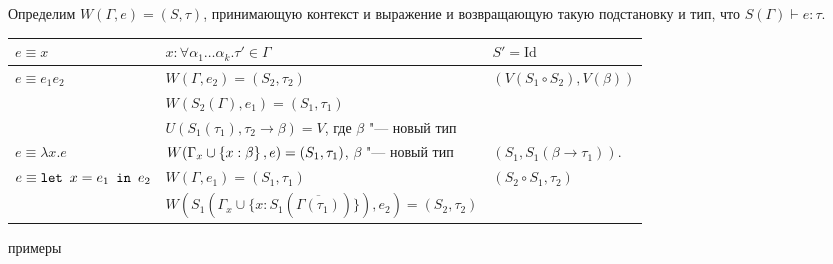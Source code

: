 Определим $W(\Gamma, e) = (S, \tau)$, принимающую контекст и выражение и возвращающую такую подстановку и тип,
что $S(\Gamma) \vdash e : \tau$.
\begin{center}
\begin{tabular}{l l l} \toprule
    $e \equiv x$
        & $x : \forall \alpha_1 \ldots \alpha_k . \tau' \in \Gamma$
        & $S'=\mathrm{Id}$ \\ \midrule
    $e \equiv e_1 e_2$
            & $W(\Gamma, e_2) = (S_2, \tau_2)$ & $(V(S_1 \circ S_2), V(\beta))$ \\ \addlinespace[0.6ex]
            & $W(S_2(\Gamma), e_1) = (S_1, \tau_1)$ & \\ \addlinespace[0.6ex]
            & $U(S_1(\tau_1), \tau_2 \rightarrow \beta) = V$, где $\beta$ "--- новый тип & \\ \midrule
    $e\equiv\lambda x . e$
        & $W(\Gamma_x \cup \left\{x : \beta\right\}, e) = (S_1, \tau_1)$, $\beta$ "--- новый тип
        & $(S_1, S_1(\beta \rightarrow \tau_1))$. \\ \midrule
    $e\equiv\mathinner{\mathtt{let}}~x=e_1~\mathinner{\mathtt{in}}~e_2$
        & $W(\Gamma, e_1) = (S_1, \tau_1)$ & $(S_2 \circ S_1, \tau_2)$ \\ \addlinespace[0.6ex]
        & $W(S_1(\Gamma_x \cup \{x : S_1(\overline{\Gamma(\tau_1)})\}), e_2) = (S_2, \tau_2)$ & \\ \bottomrule
\end{tabular}
\end{center}
\todo примеры
